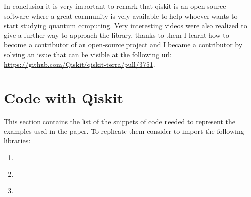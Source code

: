 \documentclass[english]{article}
\begin{document}
\begin{appendices}
			In conclusion it is very important to remark that qiskit is an open source software where a great community is very available to help whoever wants to start studying quantum computing. Very interesting videos were also realized to give a further way to approach the library, thanks to them I learnt how to become a contributor of an open-source project and I became a contributor by solving an issue that can be visible at the following url: \url{https://github.com/Qiskit/qiskit-terra/pull/3751}.
		
		\section{Code with Qiskit}
		This section contains the list of the snippets of code needed to represent the examples used in the paper. To replicate them consider to import the following libraries:
		
		
		\label{sec:codeWithQiskit}
			\begin{enumerate}
				\item \label{c:example3} 
				
				\item \label{c:example6} 
				
				\item \label{c:decisionCircuit} 
			\end{enumerate}
	\end{appendices}
	
	\clearpage
	
	\nocite{*}
	
\end{document}
